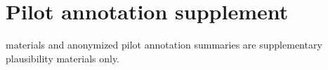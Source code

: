 \section{Pilot annotation supplement}\nQuestionnaire materials and anonymized pilot annotation summaries are supplementary plausibility materials only.\n
